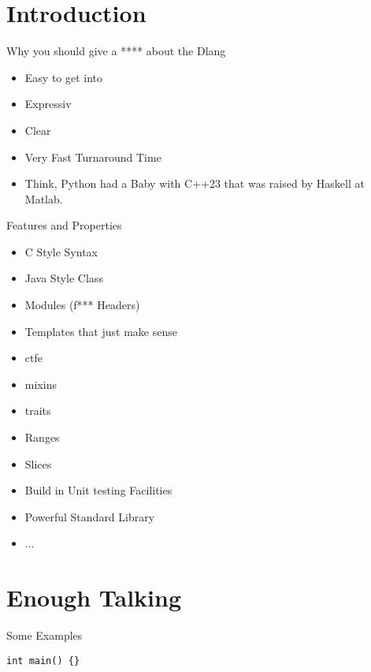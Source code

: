 \documentclass[xelatex,12pt]{beamer}
\begin{document}
\section{Introduction}
\begin{frame}{Why you should give a **** about the Dlang}
	\begin{itemize}
		\item Easy to get into
		\item Expressiv 
		\item Clear
		\item Very Fast Turnaround Time
		\item Think, Python had a Baby with C++23 that was raised by Haskell at
			Matlab.
	\end{itemize}
\end{frame}
\begin{frame}{Features and Properties}
	\begin{itemize}
		\item C Style Syntax
		\item Java Style Class
		\item Modules (f*** Headers)
		\item Templates that just make sense
		\item \gls{ctfe}
		\item mixins
		\item traits
		\item Ranges
		\item Slices
		\item Build in Unit testing Facilities
		\item Powerful Standard Library
		\item ...
	\end{itemize}
\end{frame}

\section{Enough Talking}
\begin{frame}{Some Examples}
	\begin{lstlisting}[style=dlang]
		int main() {}	
	\end{lstlisting}
\end{frame}
\end{document}
